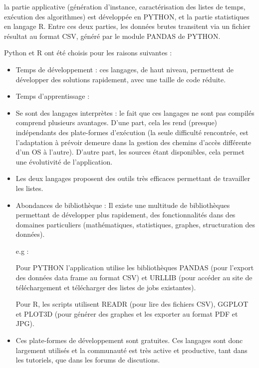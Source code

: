 \documentclass[a4paper,12pt]{report}
\theoremstyle{plain}				%
\theoremstyle{definition}				%
\begin{document}
\begin{appendices}

la partie applicative (génération d'instance, caractérisation des listes de temps, 
  exécution des algorithmes) est développée en PYTHON, et 
  la partie statistiques en langage R. 
Entre ces deux parties, les données brutes transitent via un fichier résultat au format CSV, 
 généré par le module PANDAS de PYTHON.
 
Python et R ont été choisis pour les raisons suivantes :
\begin{itemize}
\item Temps de développement : ces langages, de haut niveau, permettent de développer 
  des solutions rapidement, avec une taille de code réduite.
\item Temps d'apprentissage : 
\item Se sont des langages interprètes : le fait que ces langages ne sont pas compilés 
  comprend plusieurs avantages. 
  D'une part, cela les rend (presque) indépendants des plate-formes d'exécution
  (la seule difficulté rencontrée, est l'adaptation à prévoir demeure dans la gestion des 
  chemins d'accès différente d'un OS à l'autre).
  D'autre part, les sources étant disponibles, cela permet une évolutivité de l’application. 
\item Les deux langages proposent des outils très efficaces permettant de travailler les listes.  
\item Abondances de bibliothèque : Il existe une multitude de bibliothèques permettant de 
  développer plus rapidement, 
  des fonctionnalités dans des domaines particuliers (mathématiques, statistiques, graphes, 
  structuration des données).

  e.g : 
  
  Pour PYTHON l'application utilise les bibliothèques 
  PANDAS (pour l'export des données data frame au format CSV) et 
  URLLIB (pour accéder au site de téléchargement et télécharger des listes de jobs existantes).

  Pour R, les scripts utilisent  
  READR (pour lire des fichiers CSV),  
  GGPLOT et PLOT3D (pour générer des graphes et les exporter au format PDF et JPG).
\item Ces plate-formes de développement sont gratuites. Ces langages sont donc largement utilisés 
  et la communauté est très active et productive,
  tant dans les tutoriels, 
  que dans les forums de discutions.         
\end{itemize}


\end{appendices}
\end{document}

